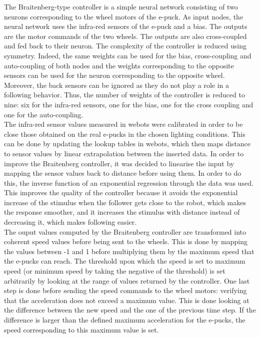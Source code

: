 \documentclass[a4, 10 pt, conference]{ieeeconf}  %
\begin{document}
The Braitenberg-type controller is a simple neural network consisting of two neurons corresponding to the wheel motors of the e-puck. As input nodes, the neural network uses the infra-red sensors of the e-puck  and a bias. The outputs are the motor commands of the two wheels. The outputs are also cross-coupled and fed back to their neuron. The complexity of the controller is reduced using symmetry. Indeed, the same weights can be used for the bias, cross-coupling and auto-coupling of both nodes and the weights corresponding to the opposite sensors can be used for the neuron corresponding to the opposite wheel. Moreover, the back sensors can be ignored as they do not play a role in a following behavior. Thus, the number of weights of the controller is reduced to nine: six for the infra-red sensors, one for the bias, one for the cross coupling and one for the auto-coupling.\\
The infra-red sensor values measured in webots were calibrated in order to be close those obtained on the real e-pucks in the chosen lighting conditions. This can be done by updating the lookup tables in webots, which then maps distance to sensor values by linear extrapolation between the inserted data. In order to improve the Braitenberg controller, it was decided to linearise the input by mapping the sensor values back to distance before using them. In order to do this, the inverse function of an exponential regression through the data was used. This improves the quality of the controller because it avoids the exponential increase of the stimulus when the follower gets close to the robot, which makes the response smoother, and it increases the stimulus with distance instead of decreasing it, which makes following easier.\\
The ouput values computed by the Braitenberg controller are transformed into coherent speed values before being sent to the wheels. This is done by mapping the values between -1 and 1 before multiplying them by the maximum speed that the e-pucks can reach. The threshold upon which the speed is set to maximum speed (or minimum speed by taking the negative of the threshold) is set arbitrarily by looking at the range of values returned by the controller.
One last step is done before sending the speed commands to the wheel motors: verifying that the acceleration does not exceed a maximum value. This is done looking at the difference between the new speed and the one of the previous time step. If the difference is larger than the defined maximum acceleration for the e-pucks, the speed corresponding to this maximum value is set.
\end{document}
